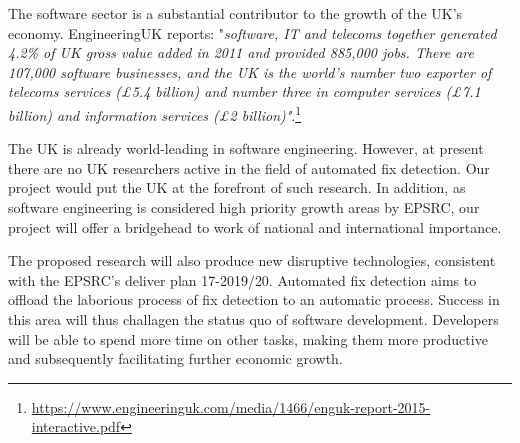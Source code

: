 The software sector is a substantial contributor to the growth of the UK's economy. EngineeringUK reports: "\textit{software, IT and telecoms together generated 4.2\% of UK gross value added in 2011 and provided 885,000 jobs. There are 107,000 software businesses, and the UK is the world's number two exporter of telecoms services (£5.4 billion) and number three in computer services (£7.1 billion) and information services (£2 billion)"}.\footnote{\url{https://www.engineeringuk.com/media/1466/enguk-report-2015-interactive.pdf}}

The UK is already world-leading in software engineering. However, at
present there are no UK researchers active in the field of automated fix detection. Our project would put the UK at the forefront of such research. In addition, as 
software engineering is considered high priority growth areas by
EPSRC\@, our project will offer a bridgehead to work of national and international importance.

The proposed research will also produce new disruptive technologies, consistent with the EPSRC's deliver plan 17-2019/20. Automated fix detection aims to offload the laborious process of fix detection to an automatic process. Success in this area will thus challagen the status quo of software development. Developers will be able to spend more time on other tasks, making them more productive and subsequently facilitating further economic growth. 